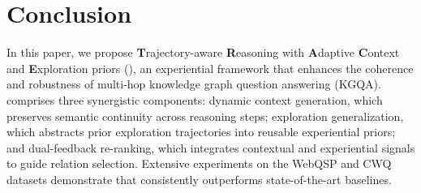 \section{Conclusion}
\vspace{-0.3cm}
In this paper, we propose \textbf{T}rajectory-aware \textbf{R}easoning with \textbf{A}daptive \textbf{C}ontext and \textbf{E}xploration priors (\method{}), an experiential framework that enhances the coherence and robustness of multi-hop knowledge graph question answering (KGQA). \method{} comprises three synergistic components: dynamic context generation, which preserves semantic continuity across reasoning steps; exploration generalization, which abstracts prior exploration trajectories into reusable experiential priors; and dual-feedback re-ranking, which integrates contextual and experiential signals to guide relation selection. Extensive experiments on the WebQSP and CWQ datasets demonstrate that \method{} consistently outperforms state-of-the-art baselines.